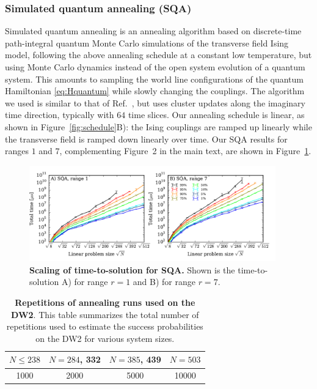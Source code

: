 \subsubsection{Simulated quantum annealing (SQA)}
\label{sec:discr-time-quant}
Simulated quantum annealing \cite{PhysRevB.66.094203,Santoro} is an annealing algorithm based on discrete-time path-integral quantum Monte Carlo simulations of the transverse field Ising model, following the above annealing schedule at a constant low temperature, but using Monte Carlo dynamics instead of the open system evolution of a quantum system. This amounts to sampling the world line configurations of the quantum Hamiltonian \eqref{eq:Hquantum} while slowly changing the couplings.  The algorithm we used is similar to that of Ref.~\cite{PhysRevB.66.094203}, but uses cluster updates along the imaginary time direction, typically with $64$ time slices. Our annealing schedule is linear, as shown in Figure~\ref{fig:schedule}B): the Ising couplings are ramped up linearly while the transverse field is ramped down linearly over time. Our SQA results for ranges $1$ and $7$, complementing Figure~2 in the main text, are shown in Figure~\ref{fig:scaling_sqa}.\\

\begin{figure}[t]
\centering
\includegraphics[width=0.95\textwidth]{sfigures/sfig05_leftover.pdf}
\caption{{\bf Scaling of time-to-solution for SQA.} Shown is the time-to-solution A) for range $r=1$ and B) for range $r=7$.}
\label{fig:scaling_sqa}
\end{figure}

\begin{table}
  \centering
  \begin{tabular}{|c|c|c|c|}\hline
 $N\le 238$ & $N=284$, 332 & $N=385$, 439 & $N=503$ \\ \hline
 1000 & 2000 & 5000 & 10000 \\ \hline
  \end{tabular}
  \caption{{\bf Repetitions of annealing runs used on the DW2}. This table summarizes the total number of repetitions used to estimate the success probabilities on the DW2 for various system sizes.}
  \label{tab:reps}
\end{table}


